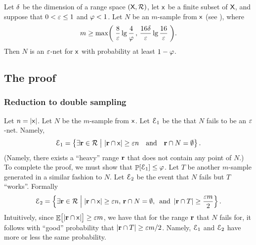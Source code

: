 \begin{theorem}
    Let $\delta$ be the \VC dimension of a range space
    $(\textsf{X},{\mathcal{R}})$, let $\mathsf{x}$ be a finite subset of $\textsf{X}$, and
    suppose that $0 < {\varepsilon} \leq 1$ and $\varphi < 1$. Let $N$ be an
    $m$-sample from $\mathsf{x}$ (see ), where
    \begin{equation}
        m \geq \max\pth{\;
           \frac{8}{\eps} \lg \frac{4}{\BadProb} \,,\,
           \frac{16\Dim}{\eps}\lg \frac{16}{\eps} \;}.
        \eqlab{e:net:2}
    \end{equation}
    Then $N$ is an ${\varepsilon}$-net for $\mathsf{x}$ with probability at
    least $1-\varphi$.
\end{theorem}


\subsection{The proof}

\subsubsection{Reduction to double sampling}

Let $n = \left| {\mathsf{x}} \right|$.  Let $N$ be the $m$-sample from
$\mathsf{x}$.  Let $\EuScript{E}_1$ be the  that $N$ fails to be
an ${\varepsilon}$-net.  Namely,
\begin{equation*}
    \Event_1%
    =%
    \Set{ \exists{\range \in \RangeSet} }{\bigl.\ts
       \cardin{\range \cap \FGroundSet} \geq \eps n \text{ ~ and ~
       } \range \cap N = \emptyset}.    
\end{equation*}
(Namely, there exists a ``heavy'' range $\mathbf{r}$ that does not contain
any point of $N$.)  To complete the proof, we must show that
$\Prob{\Event_1}\leq \BadProb$. Let $T$ be another $m$-sample
generated in a similar fashion to $N$. Let $\EuScript{E}_2$ be the event
that $N$ fails but $T$ ``works''. Formally
\begin{equation*}
    \Event_2%
    =%
    \Set{\bigl. \exists{\range \in \RangeSet}}%
    {\bigl.\cardin{\range \cap \FGroundSet} \geq \eps n, \, \range \cap
       N = \emptyset, \, \text{ and } \cardin{\range \cap T} \geq
       \frac{\eps m}{2} }.
\end{equation*}
Intuitively, since
$\mathop{\mathbb{E}}\!\left[ {\bigl. \left| {\mathbf{r} \cap \mathsf{x}} \right| } \right] \geq {\varepsilon} m$, we have
that for the range $\mathbf{r}$ that $N$ fails for, it follows with
``good'' probability that $\left| {\mathbf{r} \cap T} \right| \geq {\varepsilon} m /
2$. Namely, $\EuScript{E}_1$ and $\EuScript{E}_2$ have more or less the same
probability.

